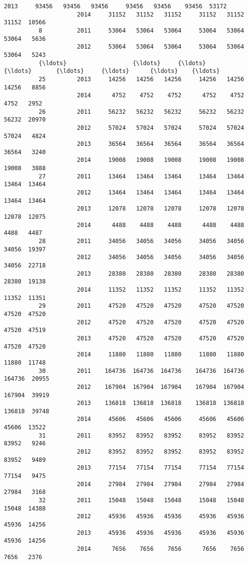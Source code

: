\documentclass[11pt]{article}
\begin{document}
\begin{Verbatim}[commandchars=\\\{\}]
                     2013     93456   93456   93456     93456   93456    93456  53172   
                     2014     31152   31152   31152     31152   31152    31152  10566   
          8          2011     53064   53064   53064     53064   53064    53064   5636   
                     2012     53064   53064   53064     53064   53064    53064   5243   
          {\ldots}                   {\ldots}     {\ldots}     {\ldots}       {\ldots}     {\ldots}      {\ldots}    {\ldots}   
          25         2013     14256   14256   14256     14256   14256    14256   8856   
                     2014      4752    4752    4752      4752    4752     4752   2952   
          26         2011     56232   56232   56232     56232   56232    56232  20970   
                     2012     57024   57024   57024     57024   57024    57024   4824   
                     2013     36564   36564   36564     36564   36564    36564   3240   
                     2014     19008   19008   19008     19008   19008    19008   3888   
          27         2011     13464   13464   13464     13464   13464    13464  13464   
                     2012     13464   13464   13464     13464   13464    13464  13464   
                     2013     12078   12078   12078     12078   12078    12078  12075   
                     2014      4488    4488    4488      4488    4488     4488   4487   
          28         2011     34056   34056   34056     34056   34056    34056  19397   
                     2012     34056   34056   34056     34056   34056    34056  22718   
                     2013     28380   28380   28380     28380   28380    28380  19138   
                     2014     11352   11352   11352     11352   11352    11352  11351   
          29         2011     47520   47520   47520     47520   47520    47520  47520   
                     2012     47520   47520   47520     47520   47520    47520  47519   
                     2013     47520   47520   47520     47520   47520    47520  47520   
                     2014     11880   11880   11880     11880   11880    11880  11748   
          30         2011    164736  164736  164736    164736  164736   164736  20955   
                     2012    167904  167904  167904    167904  167904   167904  39919   
                     2013    136818  136818  136818    136818  136818   136818  39748   
                     2014     45606   45606   45606     45606   45606    45606  13522   
          31         2011     83952   83952   83952     83952   83952    83952   9246   
                     2012     83952   83952   83952     83952   83952    83952   9489   
                     2013     77154   77154   77154     77154   77154    77154   9475   
                     2014     27984   27984   27984     27984   27984    27984   3168   
          32         2011     15048   15048   15048     15048   15048    15048  14388   
                     2012     45936   45936   45936     45936   45936    45936  14256   
                     2013     45936   45936   45936     45936   45936    45936  14256   
                     2014      7656    7656    7656      7656    7656     7656   2376   
          

\end{Verbatim}
\end{document}
